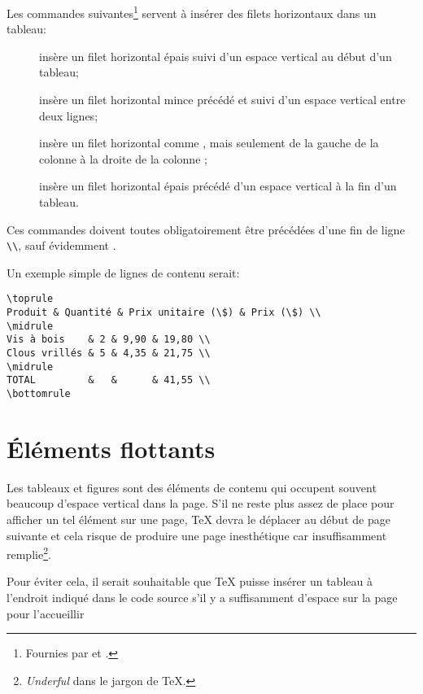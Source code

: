 \begin{list}{}
  Les commandes suivantes\footnote{%
    Fournies par  et .} %
  servent à insérer des filets horizontaux dans un tableau:
  \begin{description}
  \item[\normalfont\cmd{\toprule}] insère un filet horizontal épais
    suivi d'un espace vertical au début d'un tableau;
  \item[\normalfont\cmd{\midrule}] insère un filet horizontal mince
    précédé et suivi d'un espace vertical entre deux lignes;
  \item[\normalfont{}] insère un filet
    horizontal comme \cmd{\midrule}, mais seulement de la gauche de la
    colonne  à la droite de la colonne ;
  \item[\normalfont\cmd{\bottomrule}] insère un filet horizontal épais
    précédé d'un espace vertical à la fin d'un tableau.
  \end{description}
  Ces commandes doivent toutes obligatoirement être précédées d'une
  fin de ligne \verb=\\=, sauf évidemment \cmd{\toprule}.

  Un exemple simple de lignes de contenu serait:
\begin{lstlisting}
\toprule
Produit & Quantité & Prix unitaire (\$) & Prix (\$) \\
\midrule
Vis à bois    & 2 & 9,90 & 19,80 \\
Clous vrillés & 5 & 4,35 & 21,75 \\
\midrule
TOTAL         &   &      & 41,55 \\
\bottomrule
\end{lstlisting}
\end{list}


\section{Éléments flottants}
\label{sec:tableaux:floats}

Les tableaux et figures sont des éléments de contenu qui occupent
souvent beaucoup d'espace vertical dans la page. S'il ne reste plus
assez de place pour afficher un tel élément sur une page, {\TeX} devra
le déplacer au début de page suivante et cela risque de produire une
page inesthétique car insuffisamment remplie\footnote{%
  \emph{Underful } dans le jargon de {\TeX}.}. %

Pour éviter cela, il serait souhaitable que {\TeX} puisse insérer un
tableau à l'endroit indiqué dans le code source s'il y a suffisamment
d'espace sur la page pour l'accueillir


